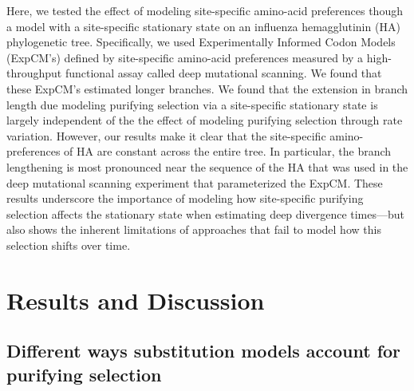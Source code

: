 \documentclass[11pt]{article}
\begin{document}
Here, we tested the effect of modeling site-specific amino-acid preferences though a model with a site-specific stationary state on an influenza hemagglutinin (HA) phylogenetic tree. 
Specifically, we used Experimentally Informed Codon Models (ExpCM's) defined by site-specific amino-acid preferences measured by a high-throughput functional assay called deep mutational scanning. 
We found that these ExpCM's estimated longer branches. 
We found that the extension in branch length due modeling purifying selection via a site-specific stationary state is largely independent of the the effect of modeling purifying selection through rate variation. 
However, our results make it clear that the site-specific amino-preferences of HA are constant across the entire tree. 
In particular, the branch lengthening is most pronounced near the sequence of the HA that was used in the deep mutational scanning experiment that parameterized the ExpCM.
These results underscore the importance of modeling how site-specific purifying selection affects the stationary state when estimating deep divergence times---but also shows the inherent limitations of approaches that fail to model how this selection shifts over time. 


\section*{Results and Discussion}

\subsection*{Different ways substitution models account for purifying selection}
\end{document}
